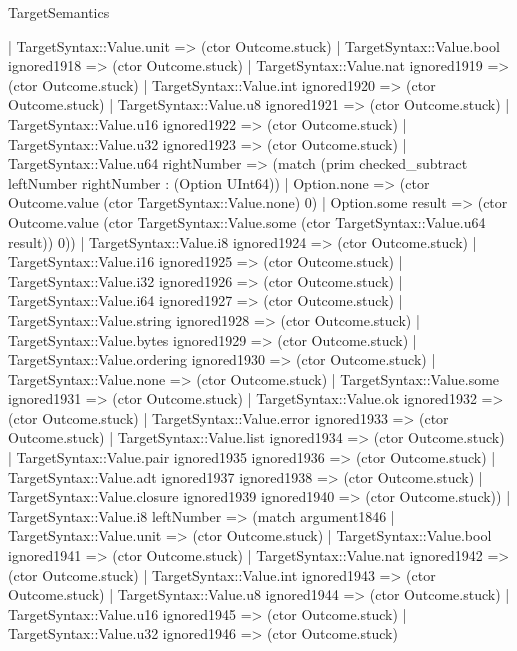 \begin{lexlean}{TargetSemantics}
\begin{semanticmodule}
{              | TargetSyntax::Value.unit => (ctor Outcome.stuck)
              | TargetSyntax::Value.bool ignored1918 => (ctor Outcome.stuck)
              | TargetSyntax::Value.nat ignored1919 => (ctor Outcome.stuck)
              | TargetSyntax::Value.int ignored1920 => (ctor Outcome.stuck)
              | TargetSyntax::Value.u8 ignored1921 => (ctor Outcome.stuck)
              | TargetSyntax::Value.u16 ignored1922 => (ctor Outcome.stuck)
              | TargetSyntax::Value.u32 ignored1923 => (ctor Outcome.stuck)
              | TargetSyntax::Value.u64 rightNumber => (match (prim checked_subtract leftNumber rightNumber : (Option UInt64))
                | Option.none => (ctor Outcome.value (ctor TargetSyntax::Value.none) 0)
                | Option.some result => (ctor Outcome.value (ctor TargetSyntax::Value.some (ctor TargetSyntax::Value.u64 result)) 0))
              | TargetSyntax::Value.i8 ignored1924 => (ctor Outcome.stuck)
              | TargetSyntax::Value.i16 ignored1925 => (ctor Outcome.stuck)
              | TargetSyntax::Value.i32 ignored1926 => (ctor Outcome.stuck)
              | TargetSyntax::Value.i64 ignored1927 => (ctor Outcome.stuck)
              | TargetSyntax::Value.string ignored1928 => (ctor Outcome.stuck)
              | TargetSyntax::Value.bytes ignored1929 => (ctor Outcome.stuck)
              | TargetSyntax::Value.ordering ignored1930 => (ctor Outcome.stuck)
              | TargetSyntax::Value.none => (ctor Outcome.stuck)
              | TargetSyntax::Value.some ignored1931 => (ctor Outcome.stuck)
              | TargetSyntax::Value.ok ignored1932 => (ctor Outcome.stuck)
              | TargetSyntax::Value.error ignored1933 => (ctor Outcome.stuck)
              | TargetSyntax::Value.list ignored1934 => (ctor Outcome.stuck)
              | TargetSyntax::Value.pair ignored1935 ignored1936 => (ctor Outcome.stuck)
              | TargetSyntax::Value.adt ignored1937 ignored1938 => (ctor Outcome.stuck)
              | TargetSyntax::Value.closure ignored1939 ignored1940 => (ctor Outcome.stuck))
            | TargetSyntax::Value.i8 leftNumber => (match argument1846
              | TargetSyntax::Value.unit => (ctor Outcome.stuck)
              | TargetSyntax::Value.bool ignored1941 => (ctor Outcome.stuck)
              | TargetSyntax::Value.nat ignored1942 => (ctor Outcome.stuck)
              | TargetSyntax::Value.int ignored1943 => (ctor Outcome.stuck)
              | TargetSyntax::Value.u8 ignored1944 => (ctor Outcome.stuck)
              | TargetSyntax::Value.u16 ignored1945 => (ctor Outcome.stuck)
              | TargetSyntax::Value.u32 ignored1946 => (ctor Outcome.stuck)
}
\end{semanticmodule}
\end{lexlean}

